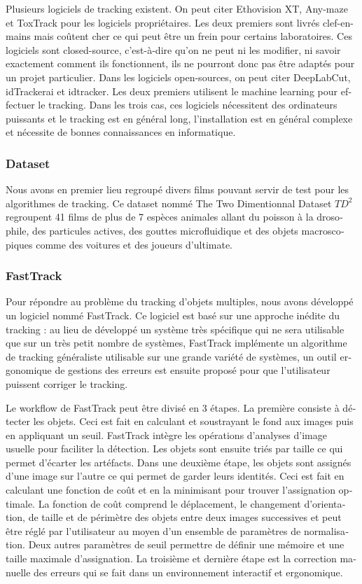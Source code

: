 \begin{otherlanguage}{french}
Plusieurs logiciels de tracking existent. On peut citer Ethovision XT, Any-maze et ToxTrack pour les logiciels propriétaires. Les deux premiers sont livrés clef-en-mains mais coûtent cher ce qui peut être un frein pour certains laboratoires. Ces logiciels sont closed-source, c’est-à-dire qu'on ne peut ni les modifier, ni savoir exactement comment ils fonctionnent, ils ne pourront donc pas être adaptés pour un projet particulier. Dans les logiciels open-sources, on peut citer DeepLabCut, idTrackerai et idtracker. Les deux premiers utilisent le machine learning pour effectuer le tracking. Dans les trois cas, ces logiciels nécessitent des ordinateurs puissants et le tracking est en général long, l'installation est en général complexe et nécessite de bonnes connaissances en informatique.

\subsubsection*{Dataset}
Nous avons en premier lieu regroupé divers films pouvant servir de test pour les algorithmes de tracking. Ce dataset nommé The Two Dimentionnal Dataset $TD^2$ regroupent 41 films de plus de 7 espèces animales allant du poisson à la drosophile, des particules actives, des gouttes microfluidique et des objets macroscopiques comme des voitures et des joueurs d'ultimate.

\subsubsection*{FastTrack}
Pour répondre au problème du tracking d'objets multiples, nous avons développé un logiciel nommé FastTrack. Ce logiciel est basé sur une approche inédite du tracking : au lieu de développé un système très spécifique qui ne sera utilisable que sur un très petit nombre de systèmes, FastTrack implémente un algorithme de tracking généraliste utilisable sur une grande variété de systèmes, un outil ergonomique de gestions des erreurs est ensuite proposé pour que l'utilisateur puissent corriger le tracking.

Le workflow de FastTrack peut être divisé en 3 étapes. La première consiste à détecter les objets. Ceci est fait en calculant et soustrayant le fond aux images puis en appliquant un seuil. FastTrack intègre les opérations d'analyses d'image usuelle pour faciliter la détection. Les objets sont ensuite triés par taille ce qui permet d'écarter les artéfacts. Dans une deuxième étape, les objets sont assignés d'une image sur l'autre ce qui permet de garder leurs identités. Ceci est fait en calculant une fonction de coût et en la minimisant pour trouver l'assignation optimale. La fonction de coût comprend le déplacement, le changement d'orientation, de taille et de périmètre des objets entre deux images successives et peut être réglé par l'utilisateur au moyen d'un ensemble de paramètres de normalisation. Deux autres paramètres de seuil permettre de définir une mémoire et une taille maximale d'assignation. La troisième et dernière étape est la correction manuelle des erreurs qui se fait dans un environnement interactif et ergonomique.


\end{otherlanguage}
